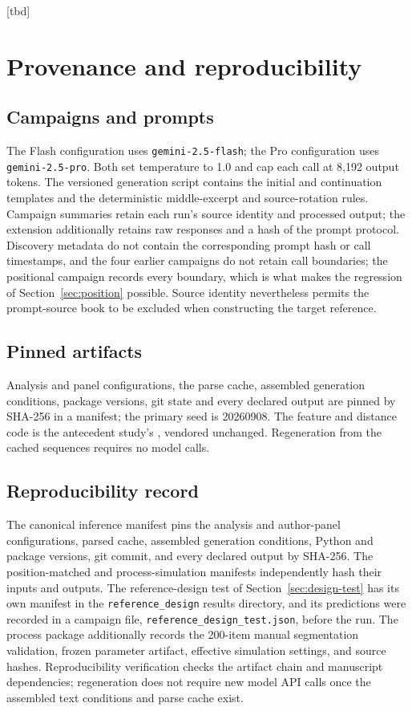 \documentclass[11pt]{article}
\begin{document}
[tbd]

\appendix

\section{Provenance and reproducibility}

\subsection{Campaigns and prompts}

The Flash configuration uses \texttt{gemini-2.5-flash}; the Pro configuration
uses \texttt{gemini-2.5-pro}.  Both set temperature to 1.0 and cap each call
at 8,192 output tokens.  The versioned generation
script contains the initial and continuation templates and the deterministic
middle-excerpt and source-rotation rules.  Campaign summaries retain each
run's source identity and processed output; the extension additionally
retains raw responses and a hash of the prompt protocol.  Discovery metadata
do not contain the corresponding prompt hash or call timestamps, and the
four earlier campaigns do not retain call boundaries; the positional
campaign records every boundary, which is what makes the regression of
Section~\ref{sec:position} possible.  Source identity nevertheless permits the
prompt-source book to be excluded when constructing the target reference.

\subsection{Pinned artifacts}
\label{sec:provenance}

Analysis and panel configurations, the parse cache, assembled generation
conditions, package versions, git state and every declared output are
pinned by SHA-256 in a manifest; the primary seed is 20260908.  The feature
and distance code is the antecedent study's \cite{darmon2021}, vendored
unchanged.  Regeneration from the cached sequences requires no model calls.

\subsection{Reproducibility record}
\label{app:repro}

The canonical inference manifest pins the analysis and author-panel
configurations, parsed cache, assembled generation conditions, Python and
package versions, git commit, and every declared output by SHA-256.  The
position-matched and process-simulation manifests independently hash their
inputs and outputs.  The reference-design test of
Section~\ref{sec:design-test} has its own manifest in the
\texttt{reference\_design} results directory, and its predictions were
recorded in a campaign file, \texttt{reference\_design\_test.json},
before the run.  The process package additionally records the 200-item
manual segmentation validation, frozen parameter artifact, effective
simulation settings, and source hashes.  Reproducibility verification checks
the artifact chain and manuscript dependencies; regeneration does not require
new model API calls once the assembled text conditions and parse cache exist.
\end{document}
